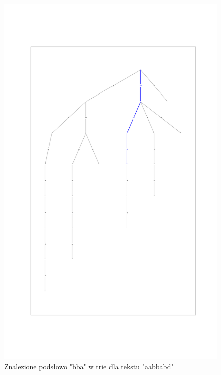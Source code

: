 \documentclass{article}
\begin{document}
	\begin{figure}[htp]
	\centering
	\includegraphics[width = \textwidth]{trie_text_example.png}
	\caption{Znalezione podsłowo "bba" w trie dla tekstu "aabbabd"}
	\label{}
	\end{figure}
	
\end{document}
